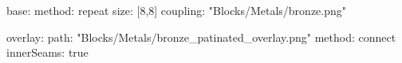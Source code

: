 base:
  method: repeat
  size: [8,8]
  coupling: "Blocks/Metals/bronze.png"
  
overlay:
  path: "Blocks/Metals/bronze_patinated_overlay.png"
  method: connect
  innerSeams: true